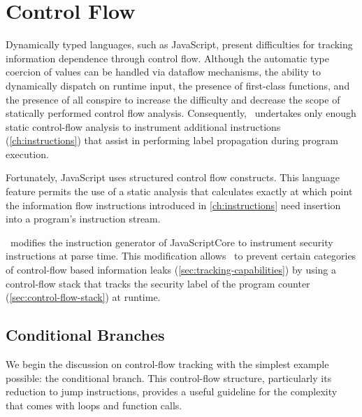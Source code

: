 \section{Control Flow}

Dynamically typed languages, such as JavaScript, present difficulties for tracking information dependence through control flow.
Although the automatic type coercion of values can be handled via dataflow mechanisms, the ability to dynamically dispatch on runtime input, the presence of first-class functions, and the presence of  all conspire to increase the difficulty and decrease the scope of statically performed control flow analysis.
Consequently, \FlowCore\ undertakes only enough static control-flow analysis to instrument additional instructions (\autoref{ch:instructions}) that assist in performing label propagation during program execution.

Fortunately, JavaScript uses structured control flow constructs.
This language feature permits the use of a static analysis that calculates exactly at which point the information flow instructions introduced in \autoref{ch:instructions} need insertion into a program's instruction stream.

\FlowCore\ modifies the instruction generator of JavaScriptCore to instrument security instructions at parse time.
This modification allows \FlowCore\ to prevent certain categories of control-flow based information leaks (\autoref{sec:tracking-capabilities}) by using a control-flow stack that tracks the security label of the program counter (\autoref{sec:control-flow-stack}) at runtime.


\subsection{Conditional Branches}
\label{sec:conditional-branch}

We begin the discussion on control-flow tracking with the simplest example possible: the conditional branch.
This control-flow structure, particularly its reduction to jump instructions, provides a useful guideline for the complexity that comes with loops and function calls.

